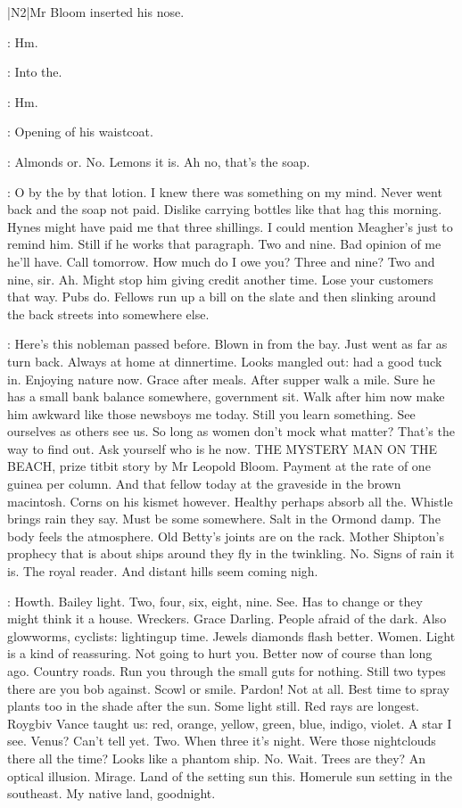 |N2|Mr Bloom inserted his nose.

\Bloom:
Hm.

:
Into the.

\Bloom:
Hm.

:
Opening of his waistcoat.

\Bloom:
Almonds or. No. Lemons it is. Ah no, that's the soap.

\Bloom:
O by the by that lotion. I knew there was something on my mind.
Never went back and the soap not paid. Dislike carrying bottles like that
hag this morning. Hynes might have paid me that three shillings. I could
mention Meagher's just to remind him. Still if he works that paragraph.
Two and nine. Bad opinion of me he'll have. Call tomorrow. How much do
I owe you? Three and nine? Two and nine, sir. Ah. Might stop him giving
credit another time. Lose your customers that way. Pubs do. Fellows run up
a bill on the slate and then slinking around the back streets into
somewhere else.

\Bloom:
Here's this nobleman passed before. Blown in from the bay. Just went
as far as turn back. Always at home at dinnertime. Looks mangled out: had
a good tuck in. Enjoying nature now. Grace after meals. After supper walk
a mile. Sure he has a small bank balance somewhere, government sit. Walk
after him now make him awkward like those newsboys me today. Still you
learn something. See ourselves as others see us. So long as women don't
mock what matter? That's the way to find out. Ask yourself who is he now.
THE MYSTERY MAN ON THE BEACH, prize titbit story by Mr Leopold Bloom.
Payment at the rate of one guinea per column. And that fellow today at the
graveside in the brown macintosh. Corns on his kismet however. Healthy
perhaps absorb all the. Whistle brings rain they say. Must be some
somewhere. Salt in the Ormond damp. The body feels the atmosphere. Old
Betty's joints are on the rack. Mother Shipton's prophecy that is about
ships around they fly in the twinkling. No. Signs of rain it is. The royal
reader. And distant hills seem coming nigh.

\Bloom:
Howth. Bailey light. Two, four, six, eight, nine. See. Has to change or
they might think it a house. Wreckers. Grace Darling. People afraid of the
dark. Also glowworms, cyclists: lightingup time. Jewels diamonds flash
better. Women. Light is a kind of reassuring. Not going to hurt you.
Better now of course than long ago. Country roads. Run you through the
small guts for nothing. Still two types there are you bob against.
Scowl or smile. Pardon! Not at all. Best time to spray plants too in the
shade after the sun. Some light still. Red rays are longest. Roygbiv
Vance taught us: red, orange, yellow, green, blue, indigo, violet.
A star I see. Venus? Can't tell yet. Two. When three it's night. Were
those nightclouds there all the time? Looks like a phantom ship. No.
Wait. Trees are they? An optical illusion. Mirage. Land of the setting
sun this. Homerule sun setting in the southeast. My native land,
goodnight.

